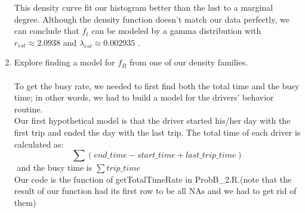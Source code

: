 \documentclass[letterpaper, 12 pt, conference]{article}
\begin{document}
\begin{enumerate}
    This density curve fit our histogram better than the last to a marginal degree. Although the density function doesn't match our data perfectly, we can conclude that $f_t$ can be modeled by a gamma distribution with $r_{est} \approx 2.0938$ and $\lambda_{est} \approx 0.002935$ .
    
    \item Explore finding a model for $f_B$ from one of our density families.
    \\
    \\To get the busy rate, we needed to first find both the total time and the busy time; in other words, we had to build a model for the drivers' behavior routine.
    \\Our first hypothetical model is that the driver started his/her day with the first trip and ended the day with the last trip. The total time of each driver is calculated as:
    \begin{equation}
        \sum(end\_time - start\_time + last\_trip\_time)
    \end{equation}$ $ and the busy time is $\sum trip\_time$
    \\Our code is the function of getTotalTimeRate in ProbB\_2.R.(note that the result of our function had its first row to be all NAs and we had to get rid of them)
    \begin{lstlisting}


\end{lstlisting}
\end{enumerate}
\end{document}
